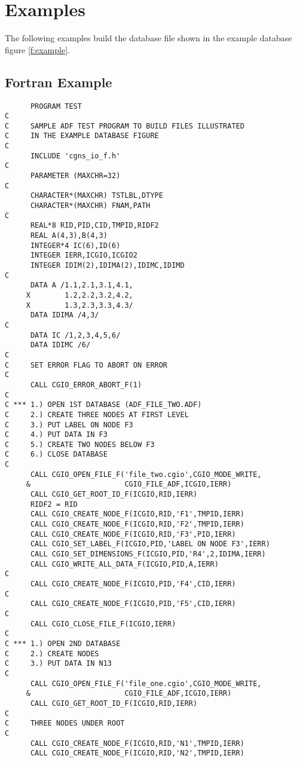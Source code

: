 \section{Examples}
\label{s:examples}

The following examples build the database file shown in the
example database figure \autoref{f:example}.

\subsection{Fortran Example} \label{s:Fortran}

\begin{verbatim}
      PROGRAM TEST
C
C     SAMPLE ADF TEST PROGRAM TO BUILD FILES ILLUSTRATED
C     IN THE EXAMPLE DATABASE FIGURE
C
      INCLUDE 'cgns_io_f.h'
C
      PARAMETER (MAXCHR=32)
C
      CHARACTER*(MAXCHR) TSTLBL,DTYPE
      CHARACTER*(MAXCHR) FNAM,PATH
C
      REAL*8 RID,PID,CID,TMPID,RIDF2
      REAL A(4,3),B(4,3)
      INTEGER*4 IC(6),ID(6)
      INTEGER IERR,ICGIO,ICGIO2
      INTEGER IDIM(2),IDIMA(2),IDIMC,IDIMD
C
      DATA A /1.1,2.1,3.1,4.1,
     X        1.2,2.2,3.2,4.2,
     X        1.3,2.3,3.3,4.3/
      DATA IDIMA /4,3/
C
      DATA IC /1,2,3,4,5,6/
      DATA IDIMC /6/
C
C     SET ERROR FLAG TO ABORT ON ERROR
C
      CALL CGIO_ERROR_ABORT_F(1)
C
C *** 1.) OPEN 1ST DATABASE (ADF_FILE_TWO.ADF)
C     2.) CREATE THREE NODES AT FIRST LEVEL
C     3.) PUT LABEL ON NODE F3
C     4.) PUT DATA IN F3
C     5.) CREATE TWO NODES BELOW F3
C     6.) CLOSE DATABASE
C
      CALL CGIO_OPEN_FILE_F('file_two.cgio',CGIO_MODE_WRITE,
     &                      CGIO_FILE_ADF,ICGIO,IERR)
      CALL CGIO_GET_ROOT_ID_F(ICGIO,RID,IERR)
      RIDF2 = RID
      CALL CGIO_CREATE_NODE_F(ICGIO,RID,'F1',TMPID,IERR)
      CALL CGIO_CREATE_NODE_F(ICGIO,RID,'F2',TMPID,IERR)
      CALL CGIO_CREATE_NODE_F(ICGIO,RID,'F3',PID,IERR)
      CALL CGIO_SET_LABEL_F(ICGIO,PID,'LABEL ON NODE F3',IERR)
      CALL CGIO_SET_DIMENSIONS_F(ICGIO,PID,'R4',2,IDIMA,IERR)
      CALL CGIO_WRITE_ALL_DATA_F(ICGIO,PID,A,IERR)
C
      CALL CGIO_CREATE_NODE_F(ICGIO,PID,'F4',CID,IERR)
C
      CALL CGIO_CREATE_NODE_F(ICGIO,PID,'F5',CID,IERR)
C
      CALL CGIO_CLOSE_FILE_F(ICGIO,IERR)
C
C *** 1.) OPEN 2ND DATABASE
C     2.) CREATE NODES
C     3.) PUT DATA IN N13
C
      CALL CGIO_OPEN_FILE_F('file_one.cgio',CGIO_MODE_WRITE,
     &                      CGIO_FILE_ADF,ICGIO,IERR)
      CALL CGIO_GET_ROOT_ID_F(ICGIO,RID,IERR)
C
C     THREE NODES UNDER ROOT
C
      CALL CGIO_CREATE_NODE_F(ICGIO,RID,'N1',TMPID,IERR)
      CALL CGIO_CREATE_NODE_F(ICGIO,RID,'N2',TMPID,IERR)

\end{verbatim}
